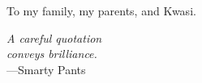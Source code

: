 %
\begin{frontmatter}

%
%
\makefrontmatter

%
%
%
%
%
%
\begin{dedication}
  To my family, my parents, and Kwasi.
\end{dedication}


%
%



%
%
\begin{epigraph} %
  \emph{A careful quotation\\
  conveys brilliance.}\\
  ---Smarty Pants
\end{epigraph}

%


%
\tableofcontents
\listoffigures  %
\listoftables   %




\end{frontmatter}
